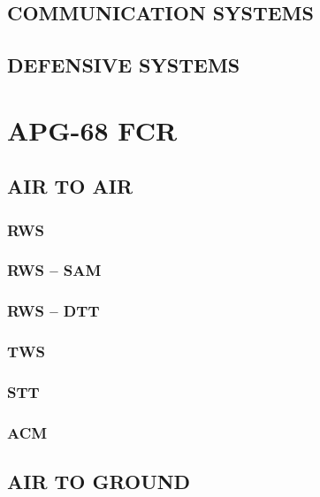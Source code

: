 \documentclass[fontInter]{TechCheck}
\begin{document}
	\clearpage

	\section{COMMUNICATION SYSTEMS}

	\clearpage
	
	\section{DEFENSIVE SYSTEMS}

	\clearpage

	\cleardoublepage

	\chapter{APG-68 FCR}
	\minitoc
	\cleardoublepage

	\section{AIR TO AIR}
	
	\subsection{RWS}

	\subsection{RWS -- SAM}

	\subsection{RWS -- DTT}

	\subsection{TWS}

	\subsection{STT}

	\subsection{ACM}

	\clearpage 

	\section{AIR TO GROUND}
\end{document}
